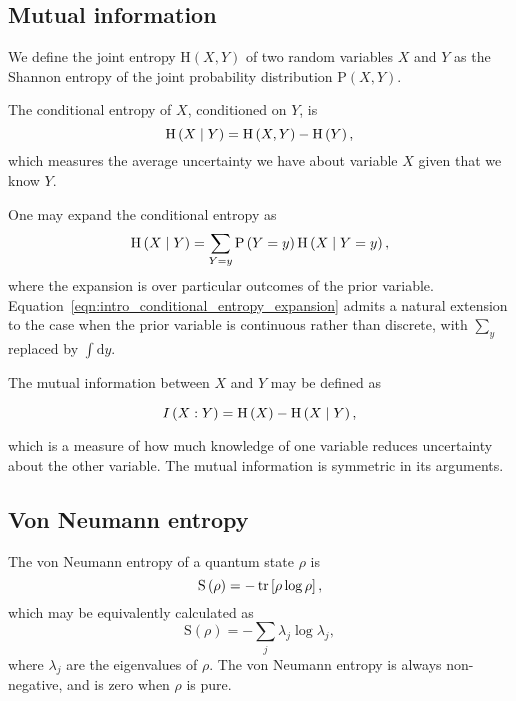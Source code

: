 \FloatBarrier
\subsection{Mutual information}
We define the joint entropy $\text{H}\left(X, Y\right)$ of two random variables $X$ and $Y$ as the Shannon entropy of the joint probability distribution $\text{P}\left(X, Y\right)$. 

The conditional entropy of $X$, conditioned on $Y$, is
\begin{equation}\label{eqn:intro_definition_conditional_entropy}
\text{H}\left(X \; \middle| \; Y\right) = \text{H}\left(X, Y\right) - \text{H}\left(Y\right),
\end{equation}
which measures the average uncertainty we have about variable $X$ given that we know $Y$.

One may expand the conditional entropy as \cite{Wilde2013}
\begin{equation}\label{eqn:intro_conditional_entropy_expansion}
\text{H}\left(X \; \middle| \; Y\right) = \sum_{Y=y} \text{P}\left(Y=y\right) \text{H}\left( X \; \middle| \; Y=y \right),
\end{equation}
where the expansion is over particular outcomes of the prior variable. Equation~\ref{eqn:intro_conditional_entropy_expansion} admits a natural extension to the case when the prior variable is continuous rather than discrete, with $\sum_{y}$ replaced by $\int \mathrm{d}y$.


The mutual information between $X$ and $Y$ may be defined as

\begin{equation}\label{eqn:intro_mutual_information}
I\left(X : Y\right) = \text{H}\left(X\right) - \text{H}\left(X \; \middle| \; Y\right),
\end{equation}

\noindent which is a measure of how much knowledge of one variable reduces uncertainty about the other variable. The mutual information is symmetric in its arguments.


\FloatBarrier
\subsection{Von Neumann entropy}
The von Neumann entropy of a quantum state $\rho$ is
\begin{equation}
\text{S}\left(\rho\right) = - \tr\left[\rho \log \rho \right],
\end{equation}
which may be equivalently calculated as
\begin{equation}\label{eqn:intro_von_neumann}
\text{S}\left(\rho\right) = - \sum_j \lambda_j \log \lambda_j,
\end{equation}
where $\lambda_j$ are the eigenvalues of $\rho$. The von Neumann entropy is always non-negative, and is zero when $\rho$ is pure.

